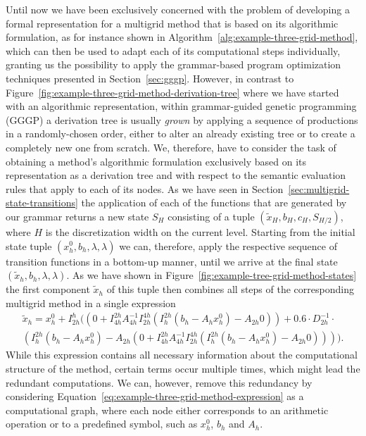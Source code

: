 Until now we have been exclusively concerned with the problem of developing a formal representation for a multigrid method that is based on its algorithmic formulation, as for instance shown in Algorithm~\ref{alg:example-three-grid-method}, which can then be used to adapt each of its computational steps individually, granting us the possibility to apply the grammar-based program optimization techniques presented in Section~\ref{sec:gggp}.
However, in contrast to Figure~\ref{fig:example-three-grid-method-derivation-tree} where we have started with an algorithmic representation, within grammar-guided genetic programming (GGGP) a derivation tree is usually \emph{grown} by applying a sequence of productions in a randomly-chosen order, either to alter an already existing tree or to create a completely new one from scratch.
We, therefore, have to consider the task of obtaining a method's algorithmic formulation exclusively based on its representation as a derivation tree and with respect to the semantic evaluation rules that apply to each of its nodes.
As we have seen in Section~\ref{sec:multigrid-state-transitions} the application of each of the functions that are generated by our grammar returns a new state $S_H$ consisting of a tuple $\left( \tilde{x}_{H}, b_{H}, c_{H}, S_{H/2}\right)$, where $H$ is the discretization width on the current level.
Starting from the initial state tuple $\left(x_{h}^0, b_{h}, \lambda, \lambda\right)$ we can, therefore, apply the respective sequence of transition functions in a bottom-up manner, until we arrive at the final state $\left(\tilde{x}_{h}, b_{h}, \lambda, \lambda\right)$.
As we have shown in Figure~\ref{fig:example-tree-grid-method-states} the first component $\tilde{x}_{h}$ of this tuple then combines all steps of the corresponding multigrid method in a single expression
\begin{multline}
	\tilde{x}_h = x_{h}^0 + I_{2h}^h ((0 + I_{4h}^{2h} A_{4h}^{-1} I_{2h}^{4h} (I_{h}^{2h}(b_{h} - A_h x_{h}^0) - A_{2h} 0)) + 0.6 \cdot D_{2h}^{-1} \cdot \\ 
	(I_{h}^{2h}(b_{h} - A_h x_{h}^0) - A_{2h} (0 + I_{4h}^{2h} A_{4h}^{-1} I_{2h}^{4h} (I_{h}^{2h}(b_{h} - A_h x_{h}^0) - A_{2h} 0)))).
	\label{eq:example-three-grid-method-expression}
\end{multline}
While this expression contains all necessary information about the computational structure of the method, certain terms occur multiple times, which might lead the redundant computations.
We can, however, remove this redundancy by considering Equation~\eqref{eq:example-three-grid-method-expression} as a computational graph, where each node either corresponds to an arithmetic operation or to a predefined symbol, such as $x^0_h$, $b_h$ and $A_h$.
